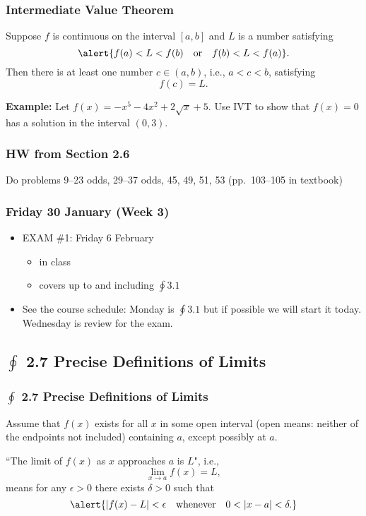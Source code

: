 \documentclass[14pt]{beamer}
\begin{document}
\begin{frame}
\frametitle{Intermediate Value Theorem}
\small
\begin{thm} Suppose \alert{$f$ is continuous on the interval $[a,b]$} and $L$ is a number satisfying
\[\alert{f(a)<L<f(b)\quad\text{or}\quad f(b)<L<f(a)}.\]  
Then there is at least one number $c\in (a,b)$, i.e., $a<c<b$, satisfying 
\[f(c)=L.\] \end{thm}

{\bf Example:}  Let $f(x)=-x^5-4x^2+2\sqrt{x}+5.$  Use IVT to show that $f(x)=0$ has a solution in the interval $(0,3)$.
\end{frame}

\begin{frame}
\frametitle{HW from Section 2.6}
Do problems 9--23 odds, 29--37 odds, 45, 49, 51, 53 (pp.\ 103--105 in textbook)
\end{frame}


\begin{frame}
\frametitle{Friday 30 January (Week 3)}
\begin{itemize}
\item EXAM \#1: Friday 6 February 
	\begin{itemize}
	\footnotesize
	\item in class
	\item covers up to and including $\oint 3.1$
	\end{itemize}
\item See the course schedule: Monday is $\oint 3.1$ but if possible we will start it today.  Wednesday is review for the exam.	
\end{itemize}
\end{frame}

\subsection[2.7 Precise Definitions of Limits]{$\oint$ 2.7 Precise Definitions of Limits}

\begin{frame}
\frametitle{$\oint$ 2.7 Precise Definitions of Limits}
\small
Assume that $f(x)$ exists for all $x$ in some open interval (open means: neither of the endpoints not included) containing $a$, except possibly at $a$.  

\vspace{1pc}
\alert{``The limit of $f(x)$ as $x$ approaches $a$ is $L$"}, i.e.,
\[\lim_{x \to a}f(x)=L,\]
means \alert{for any $\epsilon > 0$ there exists $\delta > 0$ such that} 
\[\alert{|f(x)-L|<\epsilon \quad \text{whenever} \quad 0<|x-a|<\delta.}\]
\end{frame}
\end{document}
